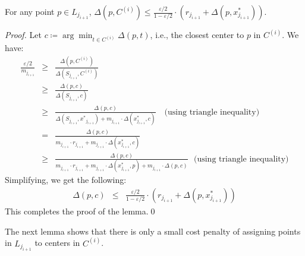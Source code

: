 \documentclass[11pt]{llncs}
\newcommand{\veps}{\varepsilon}
\begin{document}
\begin{lemma}
For any point $p \in L_{j_{i+1}}$, $\Delta(p, C^{(i)}) \leq \frac{\veps/2}{1 - \veps/2} \cdot (r_{j_{i+1}} + \Delta(p, x^*_{j_{i+1}}))$.
\end{lemma}
\begin{proof}
Let $c \coloneqq \arg\min_{t \in C^{(i)}}{\Delta(p, t)}$, i.e., the closest center to $p$ in $C^{(i)}$. We have:
\begin{eqnarray*}
\frac{\veps/2}{m_{j_{i+1}}} &\geq& \frac{\Delta(p, C^{(i)})}{\Delta(S_{j_{i+1}}, C^{(i)})} \\
&\geq& \frac{\Delta(p, c)}{\Delta(S_{j_{i+1}}, c)}\\
&\geq& \frac{\Delta(p, c)}{\Delta(S_{j_{i+1}}, x^*{_{j_{i+1}}}) + m_{j_{i+1}} \cdot \Delta(x^*_{j_{i+1}}, c)} \quad \textrm{(using triangle inequality)}\\
&=& \frac{\Delta(p, c)}{m_{j_{i+1}} \cdot r_{j_{i+1}} + m_{j_{i+1}} \cdot \Delta(x^*_{j_{i+1}}, c)} \\
&\geq& \frac{\Delta(p, c)}{m_{j_{i+1}} \cdot r_{j_{i+1}} + m_{j_{i+1}} \cdot \Delta(x^*_{j_{i+1}}, p) + m_{j_{i+1}} \cdot \Delta(p, c)} \ \ \ \textrm{(using triangle inequality)}
\end{eqnarray*}
Simplifying, we get the following: 
\begin{eqnarray*}
\Delta(p, c) &\leq& \frac{\veps/2}{1 - \veps/2} \cdot (r_{j_{i+1}} + \Delta(p, x^*_{j_{i+1}}))
\end{eqnarray*}
This completes the proof of the lemma.\qed
\end{proof}
The next lemma shows that there is only a small cost penalty of assigning points in $L_{j_{i+1}}$ to centers in $C^{(i)}$.
\end{document}

